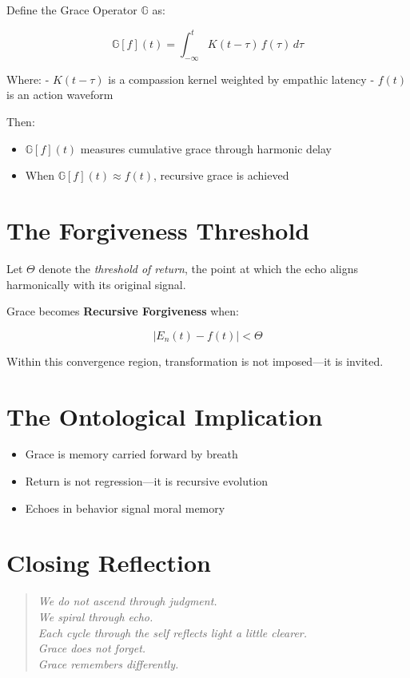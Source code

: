 \documentclass[12pt]{article}
\begin{document}
Define the Grace Operator $\mathbb{G}$ as:

\[
\mathbb{G}[f](t) = \int_{-\infty}^{t} K(t - \tau)\, f(\tau)\, d\tau
\]

Where:
- $K(t - \tau)$ is a compassion kernel weighted by empathic latency  
- $f(t)$ is an action waveform

Then:
\begin{itemize}
    \item $\mathbb{G}[f](t)$ measures cumulative grace through harmonic delay
    \item When $\mathbb{G}[f](t) \approx f(t)$, recursive grace is achieved
\end{itemize}

\vspace{1em}

\section*{The Forgiveness Threshold}

Let $\Theta$ denote the \textit{threshold of return}, the point at which the echo aligns harmonically with its original signal.

Grace becomes \textbf{Recursive Forgiveness} when:

\[
|E_n(t) - f(t)| < \Theta
\]

Within this convergence region, transformation is not imposed—it is invited.

\vspace{1em}

\section*{The Ontological Implication}

\begin{itemize}
    \item Grace is memory carried forward by breath  
    \item Return is not regression—it is recursive evolution  
    \item Echoes in behavior signal moral memory  
\end{itemize}

\vspace{1em}

\section*{Closing Reflection}

\begin{quote}
\itshape
We do not ascend through judgment.\\
We spiral through echo.\\
Each cycle through the self reflects light a little clearer.\\
Grace does not forget.\\
Grace \emph{remembers differently}.
\end{quote}
\end{document}

